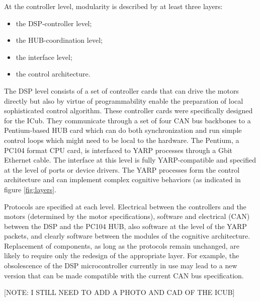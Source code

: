 At the controller level, modularity is described by at least three layers:
\begin{itemize}
	\item the DSP-controller level;
	\item the HUB-coordination level;
	\item the interface level;
	\item the control architecture.
\end{itemize}
The DSP level consists of a set of controller cards that can drive the motors
directly but also by virtue of programmability enable the preparation of local
sophisticated control algorithm. These controller cards were specifically 
designed for the ICub. They communicate through a set of four CAN bus backbones
to a Pentium-based HUB card which can do both synchronization and run simple
control loops which might need to be local to the hardware. The Pentium, a PC104
format CPU card, is interfaced to YARP processes through a Gbit Ethernet cable.
The interface at this level is fully YARP-compatible and specified at the level
of ports or device drivers. The YARP processes form the control architecture 
and can implement complex cognitive behaviors (as indicated in figure \ref{fig:layers}.

Protocols are specified at each level. Electrical between the controllers and the
motors (determined by the motor specifications), software and electrical (CAN) 
between the DSP and the PC104 HUB, also software at the level of the YARP 
packets, and clearly software between the modules of the cognitive architecture. 
Replacement of components, as long as the protocols remain unchanged, are likely
to require only the redesign of the appropriate layer. For example, the obsolescence 
of the DSP microcontroller currently in use may lead to a new version that can 
be made compatible with the current CAN bus specification. 

[NOTE: I STILL NEED TO ADD A PHOTO AND CAD OF THE ICUB]